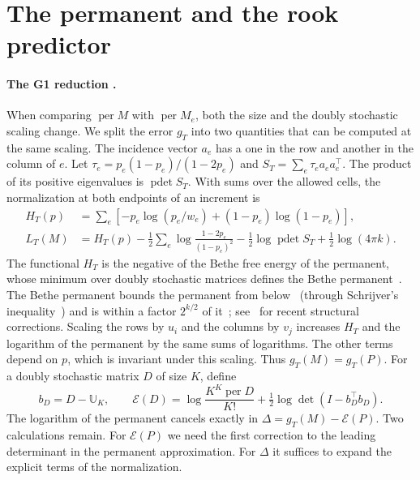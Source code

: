 \section{The permanent and the rook predictor}\label{app:torres}
\label{app:rook}
\paragraph{The G1 reduction .}
When comparing $\operatorname{per}M$ with $\operatorname{per}M_e$, both the size and the doubly
stochastic scaling change. We split the error $g_T$ into two quantities that can be computed at
the same scaling. The incidence vector $a_e$ has a one in the row and another in the column of
$e$. Let $\tau_e=p_e(1-p_e)/(1-2p_e)$ and $S_T=\sum_e\tau_e a_ea_e^\top$. The product of its
positive eigenvalues is $\operatorname{pdet}S_T$. With sums over the allowed cells, the
normalization at both endpoints of an increment is
\[
\begin{aligned}
 H_T(p)&=\sum_e[-p_e\log(p_e/w_e)+(1-p_e)\log(1-p_e)],\\
 L_T(M)&=H_T(p)-\tfrac12\sum_e\log\frac{1-2p_e}{(1-p_e)^2}
         -\tfrac12\log\operatorname{pdet} S_T+\tfrac12\log(4\pi k).
\end{aligned}
\]
The functional $H_T$ is the negative of the Bethe free energy of the permanent, whose minimum over
doubly stochastic matrices defines the Bethe permanent~\cite{vontobel,cy}. The Bethe permanent bounds
the permanent from below~\cite{gurvits} (through Schrijver's inequality~\cite{schrijver}) and is within
a factor $2^{k/2}$ of it~\cite{ar}; see~\cite{np} for recent structural corrections.
Scaling the rows by $u_i$ and the columns by $v_j$ increases $H_T$ and the logarithm of the
permanent by the same sums of logarithms. The other terms depend on $p$, which is invariant under
this scaling. Thus $g_T(M)=g_T(P)$. For a doubly stochastic matrix $D$ of size $K$, define
\[
 b_D=D-\mathbb U_K,\qquad
 \mathcal E(D)=\log\frac{K^K\operatorname{per}D}{K!}
             +\tfrac12\log\det(I-b_D^\top b_D).
\]
The logarithm of the permanent cancels exactly in $\Delta=g_T(M)-\mathcal E(P)$. Two calculations
remain. For $\mathcal E(P)$ we need the first correction to the leading determinant in the
permanent approximation. For $\Delta$ it suffices to expand the explicit terms of the
normalization.

